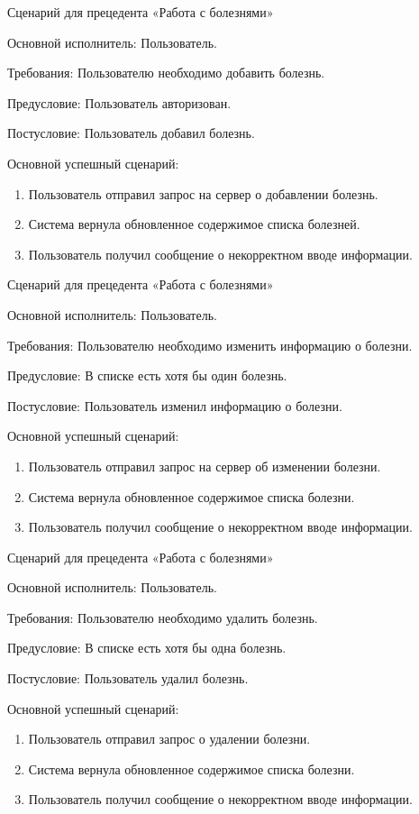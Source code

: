 Сценарий для прецедента «Работа с болезнями»

Основной исполнитель: Пользователь.

Требования: Пользователю необходимо добавить болезнь.

Предусловие: Пользователь авторизован.

Постусловие: Пользователь добавил болезнь.

Основной успешный сценарий:
\begin{enumerate}
	\item Пользователь отправил запрос на сервер о добавлении болезнь.
	\item Система вернула обновленное содержимое списка болезней.
	\item Пользователь получил сообщение о некорректном вводе информации.\\
\end{enumerate}

Сценарий для прецедента «Работа с болезнями»

Основной исполнитель: Пользователь.

Требования: Пользователю необходимо изменить информацию о болезни.

Предусловие: В списке есть хотя бы один болезнь.

Постусловие: Пользователь изменил информацию о болезни.

Основной успешный сценарий:
\begin{enumerate}
	\item Пользователь отправил запрос на сервер об изменении болезни.
	\item Система вернула обновленное содержимое списка болезни.
	\item Пользователь получил сообщение о некорректном вводе информации.\\
\end{enumerate}

Сценарий для прецедента «Работа с болезнями»

Основной исполнитель: Пользователь.

Требования: Пользователю необходимо удалить болезнь.

Предусловие: В списке есть хотя бы одна болезнь.

Постусловие: Пользователь удалил болезнь.

Основной успешный сценарий:
\begin{enumerate}
	\item Пользователь отправил запрос о удалении болезни.
	\item Система вернула обновленное содержимое списка болезни.
	\item Пользователь получил сообщение о некорректном вводе информации.\\
\end{enumerate}


